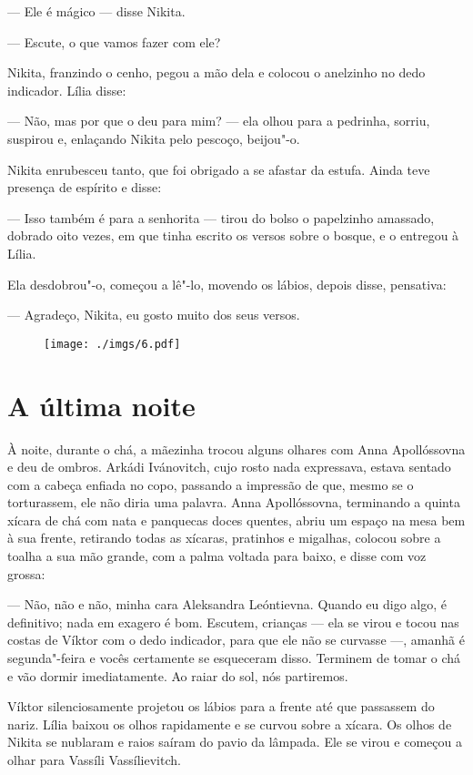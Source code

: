 --- Ele é mágico --- disse Nikita.

--- Escute, o que vamos fazer com ele?

Nikita, franzindo o cenho, pegou a mão dela e colocou o anelzinho no
dedo indicador. Lília disse:

--- Não, mas por que o deu para mim? --- ela olhou para a pedrinha,
sorriu, suspirou e, enlaçando Nikita pelo pescoço, beijou"-o.

Nikita enrubesceu tanto, que foi obrigado a se afastar da estufa. Ainda
teve presença de espírito e disse:

--- Isso também é para a senhorita --- tirou do bolso o papelzinho
amassado, dobrado oito vezes, em que tinha escrito os versos sobre o
bosque, e o entregou à Lília.

Ela desdobrou"-o, começou a lê"-lo, movendo os lábios, depois disse,
pensativa:

--- Agradeço, Nikita, eu gosto muito dos seus versos.

\begin{figure}
\vspace*{-2.1cm}
\hspace*{-2.5cm}\texttt{[image: ./imgs/6.pdf]}
\end{figure}

\chapter{A última noite}

À noite, durante o chá, a mãezinha trocou alguns olhares com Anna
Apollóssovna e deu de ombros. Arkádi Ivánovitch, cujo rosto nada
expressava, estava sentado com a cabeça enfiada no copo, passando a
impressão de que, mesmo se o torturassem, ele não diria uma palavra.
Anna Apollóssovna, terminando a quinta xícara de chá com nata e
panquecas doces quentes, abriu um espaço na mesa bem à sua frente,
retirando todas as xícaras, pratinhos e migalhas, colocou sobre a toalha
a sua mão grande, com a palma voltada para baixo, e disse com voz
grossa:

--- Não, não e não, minha cara Aleksandra Leóntievna. Quando eu digo
algo, é definitivo; nada em exagero é bom. Escutem, crianças --- ela se
virou e tocou nas costas de Víktor com o dedo indicador, para que ele
não se curvasse ---, amanhã é segunda"-feira e vocês certamente se
esqueceram disso. Terminem de tomar o chá e vão dormir imediatamente. Ao
raiar do sol, nós partiremos.

Víktor silenciosamente projetou os lábios para a frente até que
passassem do nariz. Lília baixou os olhos rapidamente e se curvou sobre
a xícara. Os olhos de Nikita se nublaram e raios saíram do pavio da
lâmpada. Ele se virou e começou a olhar para Vassíli Vassílievitch.

